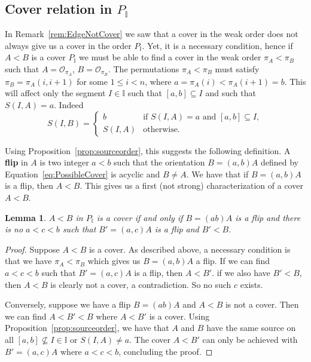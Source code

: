 \documentclass[reqno]{amsart}
\newtheorem{lemma}[theorem]{Lemma}
\theoremstyle{definition}
\newcommand{\defn}[1]{\textbf{\textsf{\color{PineGreen} #1}}} %
\newcommand{\Or}{\mathcal O}  %
\newcommand{\II}{\mathbb I} %
\begin{document}
\subsection{Cover relation in $P_\II$}  
\label{subsec:cover}

In Remark~\ref{rem:EdgeNotCover} we saw that a cover in the weak order does not always give us a cover in the order $P_\II$. Yet, it is a necessary condition, hence if
$A<B$ is a cover $P_\II$ we must be able to find a cover in the weak order $\pi_A<\pi_B$  such that $A=\Or_{\pi_A}$, $B=\Or_{\pi_B}$. The permutations $\pi_A<\pi_B$ 
must satisfy $\pi_B=\pi_A(i,i+1)$ for some $1\le i<n$, where $a=\pi_A(i)<\pi_A(i+1)=b$.
This will affect only the segment $I\in \II$ such that $[a,b]\subseteq I$ and such that $S(I,A)=a$. Indeed
\begin{equation}\label{eq:PossibleCover}
 	S(I,B)=\begin{cases}
		b& \text{if $S(I,A) = a$ and $[a,b]\subseteq I$},\\
		S(I,A)& \text{otherwise.}
	\end{cases}
\end{equation}

Using Proposition~\ref{prop:sourceorder}, this suggests the following definition. A \defn{flip} in $A$ is two integer $a<b$ such that the orientation $B=(a,b)A$ defined by Equation~\eqref{eq:PossibleCover}
is acyclic and $B\ne A$. We have that if $B=(a,b)A$ is a flip, then $A<B$. This gives us a first (not strong) characterization of a cover $A<B$.

\begin{lemma}\label{lem:coverI}
  $A<B$ in $P_\II$ is a cover if and only if $B=(a b)A$ is a  flip and there is no $a<c<b$ such that $B'=(a,c)A$ is a  flip and $B'<B$.
\end{lemma}

\begin{proof} Suppose $A<B$ is a cover. As described above, a necessary condition is that we have $\pi_A<\pi_B$ which gives us $B=(a,b)A$ a  flip.
If we can find $a<c<b$ such that $B'=(a,c)A$ is a flip, then $A<B'$. if we also have $B'<B$, then $A<B$ is clearly not a cover, a contradiction. So no such $c$ exists.

Conversely, suppose we have a flip $B=(a b)A$ and $A<B$ is not a cover. Then we can find $A<B'<B$ where $A<B'$ is a cover. Using Proposition~\ref{prop:sourceorder},
we have that $A$ and $B$ have the same source on all $[a,b]\not\subseteq I\in \II$ or $S(I,A)\ne a$. The cover $A<B'$ can only be achieved with $B'=(a,c)A$ where $a<c<b$, concluding the proof.
\end{proof}
\end{document}

